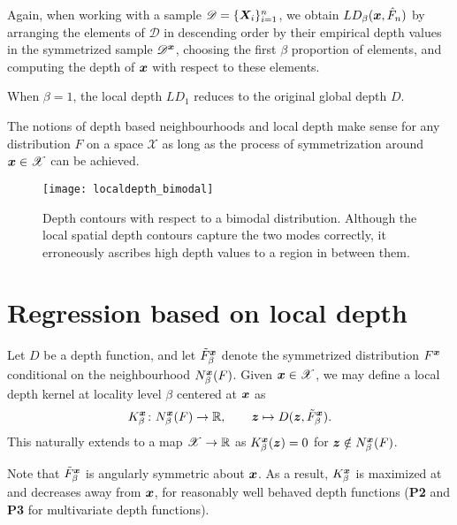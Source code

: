 Again, when working with a sample $\mathscr{D} = \{\bm{X}_i\}_{i = 1}^n$, we
obtain $LD_\beta(\bm{x}, \hat{F}_n)$ by arranging the elements of $\mathscr{D}$
in descending order by their empirical depth values in the symmetrized sample
$\mathscr{D}^{\bm{x}}$, choosing the first $\beta$ proportion of elements, and
computing the depth of $\bm{x}$ with respect to these elements.

\begin{remark}
    When $\beta = 1$, the local depth $LD_1$ reduces to the original global
    depth $D$.
\end{remark}

\begin{remark}
    The notions of depth based neighbourhoods and local depth make sense for
    any distribution $F$ on a space $\mathscr{X}$ as long as the process of
    symmetrization around $\bm{x} \in \mathscr{X}$ can be achieved.
\end{remark}


\begin{figure}
    \centering
    \texttt{[image: localdepth\_bimodal]}
    \caption{
        Depth contours with respect to a bimodal distribution.
        Although the local spatial depth contours capture the two modes
        correctly, it erroneously ascribes high depth values to a region in
        between them.
    }
    \label{fig:localdepth_bimodal}
\end{figure}


\section{Regression based on local depth}

\begin{definition}
    Let $D$ be a depth function, and let $\tilde{F}^{\bm{x}}_\beta$ denote the
    symmetrized distribution $F^{\bm{x}}$ conditional on the neighbourhood
    $N^{\bm{x}}_\beta(F)$.
    Given $\bm{x} \in \mathscr{X}$, we may define a local depth kernel at
    locality level $\beta$ centered at $\bm{x}$ as
    \begin{equation}
        K^{\bm{x}}_\beta\colon N^{\bm{x}}_\beta(F) \to \mathbb{R}, \qquad
        \bm{z} \mapsto D(\bm{z}, \tilde{F}^{\bm{x}}_\beta).
    \end{equation}
    This naturally extends to a map $\mathscr{X} \to \mathbb{R}$ as
    $K^{\bm{x}}_\beta(\bm{z}) = 0$ for $\bm{z} \notin N^{\bm{x}}_\beta(F)$.
\end{definition}

Note that $\tilde{F}^{\bm{x}}_\beta$ is angularly symmetric about $\bm{x}$.
As a result, $K^{\bm{x}}_\beta$ is maximized at and decreases away from $\bm{x}$,
for reasonably well behaved depth functions (\textbf{P2} and \textbf{P3} for
multivariate depth functions).



